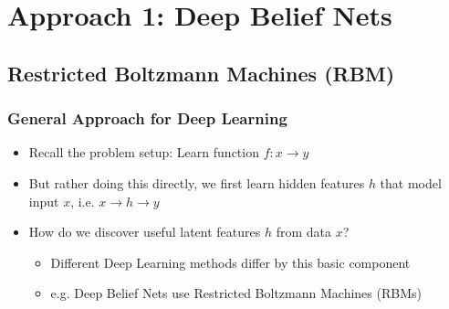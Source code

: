 \documentclass{beamer}
\newcommand{\bi}{\begin{itemize}}
\newcommand{\ei}{\end{itemize}}
\begin{document}
\section[Approach 1: Deep Belief Nets]{Approach 1: Deep Belief Nets \cite{hinton06dbn}}


\subsection[RBM]{Restricted Boltzmann Machines (RBM)}

\begin{frame}
\frametitle{General Approach for Deep Learning}
\bi
\item Recall the problem setup: Learn function $f: x \rightarrow y$ 
\pause
\item But rather doing this directly, we first learn hidden features $h$ that model input $x$, i.e.  $x \rightarrow h \rightarrow y$
\pause
\item How do we discover useful latent features $h$ from data $x$? 
\bi 
	\item Different Deep Learning methods differ by this basic component
	\item e.g. Deep Belief Nets use Restricted Boltzmann Machines (RBMs)
\ei
\ei
\end{frame}
\end{document}

